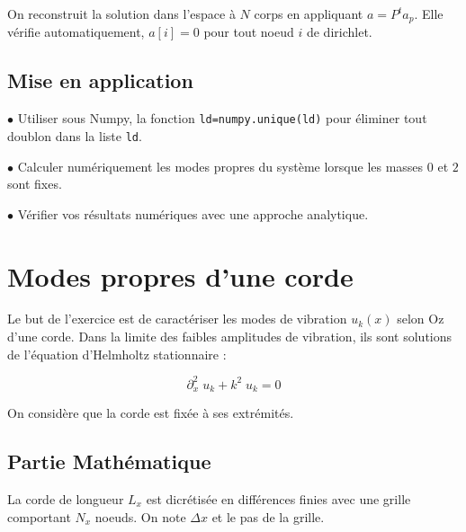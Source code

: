 \documentclass[a4paper, 12pt]{article}
\begin{document}
On reconstruit la solution dans l'espace à $N$ corps en appliquant $a=P^t a_p$. 
Elle vérifie automatiquement, $a[i]=0$ pour tout noeud $i$ de dirichlet.

\subsection{Mise en application}

$\bullet$ Utiliser sous Numpy, la fonction {\tt ld=numpy.unique(ld)} pour éliminer tout doublon dans la liste {\tt ld}.

$\bullet$ Calculer numériquement les modes propres du système lorsque les masses $0$ et $2$ sont fixes.

$\bullet$ Vérifier vos résultats numériques avec une approche analytique.


\section{Modes propres d'une corde}

Le but de l'exercice est de caractériser les modes de vibration $u_k(x)$ selon Oz d'une corde. 
Dans la limite des faibles amplitudes de vibration, 
ils sont solutions de l'équation d'Helmholtz stationnaire :

\begin{equation}
\partial_x^2 \; u_k + k^2 \; u_k=0
\label{Helm}
\end{equation}

On considère que la corde est fixée à ses extrémités.


\subsection{Partie Mathématique}

La corde de longueur $L_x$ est dicrétisée en différences finies
avec une grille comportant $N_x$ noeuds. On note $\Delta x$ et
le pas de la grille.
\end{document}

